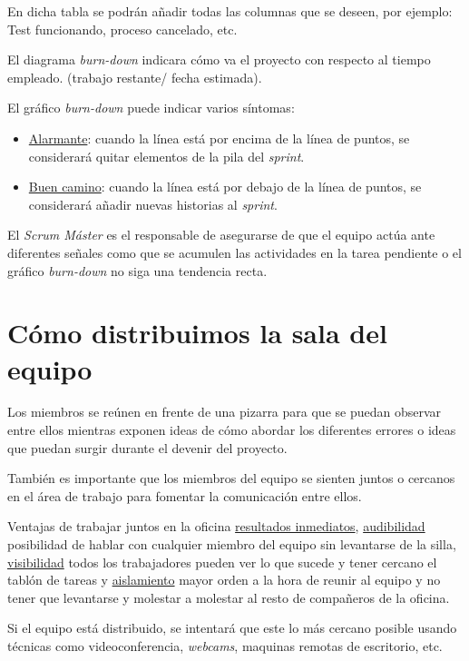 
En dicha tabla se podrán añadir todas las columnas que se deseen, por ejemplo: Test funcionando, proceso cancelado, etc.

El diagrama \textit{burn-down} indicara cómo va el proyecto con respecto al tiempo empleado. (trabajo restante/ fecha estimada).

El gráfico \textit{burn-down} puede indicar varios síntomas:
\begin{itemize}
	\item \underline{Alarmante}: cuando la línea está por encima de la línea de puntos, se considerará quitar elementos de la pila del \textit{sprint}.
	\item \underline{Buen camino}: cuando la línea está por debajo de la línea de puntos, se considerará añadir nuevas historias al \textit{sprint}.
	
\end{itemize}

El \textit{Scrum Máster} es el responsable de asegurarse de que el equipo actúa ante diferentes señales como que se acumulen las actividades en la tarea pendiente o el gráfico \textit{burn-down} no siga una tendencia recta.

\section{Cómo distribuimos la sala del equipo}

Los miembros se reúnen en frente de una pizarra para que se puedan observar entre ellos mientras exponen ideas de cómo abordar los diferentes errores o ideas que puedan surgir durante el devenir del proyecto.

También es importante que los miembros del equipo se sienten juntos o cercanos en el área de trabajo para fomentar la comunicación entre ellos. 

Ventajas de trabajar juntos en la oficina \underline{resultados inmediatos}, \underline{audibilidad} posibilidad de hablar con cualquier miembro del equipo sin levantarse de la silla, \underline{visibilidad} todos los trabajadores pueden ver lo que sucede y tener cercano el tablón de tareas y \underline{aislamiento} mayor orden a la hora de reunir al equipo y no tener que levantarse y molestar a molestar al resto de compañeros de la oficina.

Si el equipo está distribuido, se intentará que este lo más cercano posible usando técnicas como videoconferencia, \textit{webcams}, maquinas remotas de escritorio, etc.

